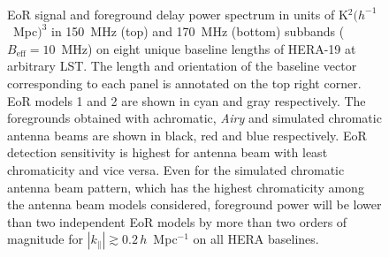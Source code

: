 \documentclass[preprint2,iop,numberedappendix,twocolappendix,appendixfloats]{emulateapj}
\begin{document}
\begin{figure}[htb]
\centering
{} \\
\caption{EoR signal and foreground delay power spectrum in units of K$^2 (h^{-1}$~Mpc$)^3$ in 150~MHz (top) and 170~MHz (bottom) subbands ($B_\textrm{eff}=10$~MHz) on eight unique baseline lengths of HERA-19 at arbitrary LST. The length and orientation of the baseline vector corresponding to each panel is annotated on the top right corner. EoR models 1 and 2 are shown in cyan and gray respectively. The foregrounds obtained with achromatic, {\it Airy} and simulated chromatic antenna beams are shown in black, red and blue respectively. EoR detection sensitivity is highest for antenna beam with least chromaticity and vice versa. Even for the simulated chromatic antenna beam pattern, which has the highest chromaticity among the antenna beam models considered, foreground power will be lower than two independent EoR models by more than two orders of magnitude for $|k_\parallel| \gtrsim 0.2\,h$~Mpc$^{-1}$ on all HERA baselines.}
\label{fig:subbands}
\end{figure}
\end{document}
